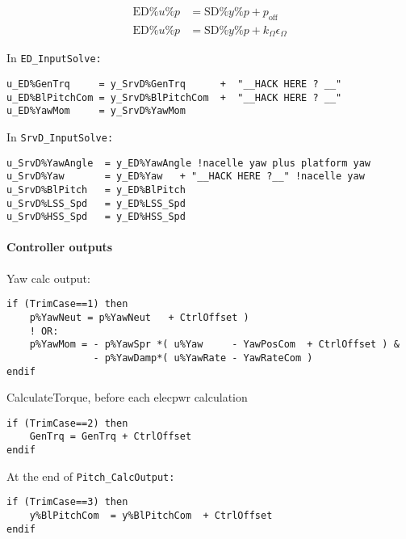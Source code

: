 % 
\begin{align}
    \text{ED}\%u\%p &= \text{SD}\%y\%p + p_\text{off}\\
    \text{ED}\%u\%p &= \text{SD}\%y\%p + k_\Omega \epsilon_\Omega
\end{align}


In \tt{ED\_InputSolve}:
\fortran
\begin{lstlisting}
u_ED%GenTrq     = y_SrvD%GenTrq      +  "__HACK HERE ? __"
u_ED%BlPitchCom = y_SrvD%BlPitchCom  +  "__HACK HERE ? __"
u_ED%YawMom     = y_SrvD%YawMom
\end{lstlisting}

In \tt{SrvD\_InputSolve}:
\begin{lstlisting}
u_SrvD%YawAngle  = y_ED%YawAngle !nacelle yaw plus platform yaw
u_SrvD%Yaw       = y_ED%Yaw   + "__HACK HERE ?__" !nacelle yaw
u_SrvD%BlPitch   = y_ED%BlPitch
u_SrvD%LSS_Spd   = y_ED%LSS_Spd
u_SrvD%HSS_Spd   = y_ED%HSS_Spd
\end{lstlisting}

\paragraph{Controller outputs}
Yaw calc output: 
\begin{lstlisting}
if (TrimCase==1) then
    p%YawNeut = p%YawNeut   + CtrlOffset ) 
    ! OR:
    p%YawMom = - p%YawSpr *( u%Yaw     - YawPosCom  + CtrlOffset ) &   
               - p%YawDamp*( u%YawRate - YawRateCom )                
endif
\end{lstlisting}
CalculateTorque, before each elecpwr calculation
\begin{lstlisting}
if (TrimCase==2) then
    GenTrq = GenTrq + CtrlOffset
endif
\end{lstlisting}
At the end of \tt{Pitch\_CalcOutput}:
\begin{lstlisting}
if (TrimCase==3) then
    y%BlPitchCom  = y%BlPitchCom  + CtrlOffset
endif
\end{lstlisting}
% 


